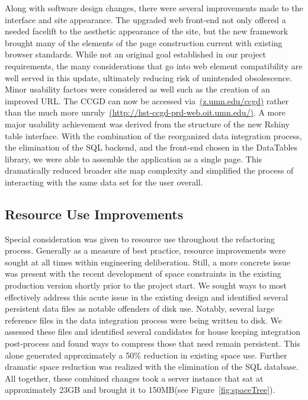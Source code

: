 \documentclass[10pt]{report}
\begin{document}
Along with software design changes, there were several improvements made to the interface and site appearance. The upgraded web front-end not only offered a needed facelift to the aesthetic appearance of the site, but the new framework brought many of the elements of the page construction current with existing browser standards. While not an original goal established in our project requirements, the many considerations that go into web element compatibility are well served in this update, ultimately reducing risk of unintended obsolescence. Minor usability factors were considered as well such as the creation of an improved URL\@. The CCGD can now be accessed via~\href{https://z.umn.edu/ccgd}{(z.umn.edu/ccgd)} rather than the much more unruly~\href{http://hst-ccgd-prd-web.oit.umn.edu/}{(http://hst-ccgd-prd-web.oit.umn.edu/)}. A more major usability achievement was derived from the structure of the new Rshiny table interface. With the combination of the reorganized data integration process, the elimination of the SQL backend, and the front-end chosen in the DataTables library, we were able to assemble the application as a single page. This dramatically reduced broader site map complexity and simplified the process of interacting with the same data set for the user overall.

\subsection{Resource Use Improvements}
Special consideration was given to resource use throughout the refactoring process. Generally as a measure of best practice, resource improvements were sought at all times within engineering deliberation. Still, a more concrete issue was present with the recent development of space constraints in the existing production version shortly prior to the project start. We sought ways to most effectively address this acute issue in the existing design and identified several persistent data files as notable offenders of disk use. Notably, several large reference files in the data integration process were being written to disk. We assessed these files and identified several candidates for house keeping integration post-process and found ways to compress those that need remain persistent. This alone generated approximately a 50\% reduction in existing space use. Further dramatic space reduction was realized with the elimination of the SQL database. All together, these combined changes took a server instance that sat at approximately 23GB and brought it to 150MB\@ (see Figure~\ref{fig:spaceTree}).
\end{document}
